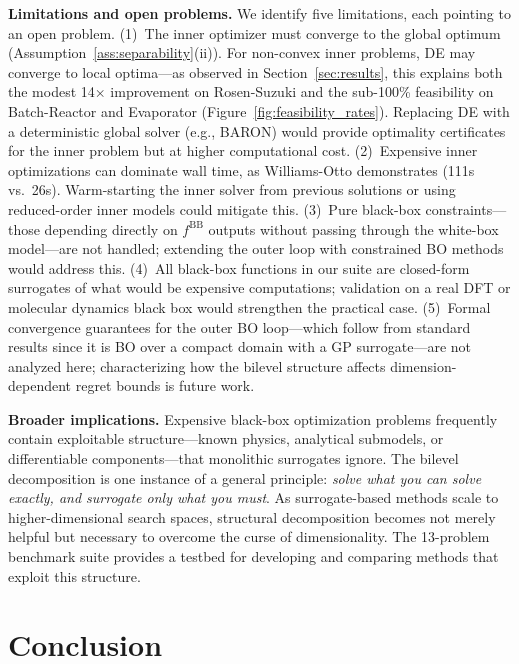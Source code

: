 \documentclass[12pt,a4paper]{article}%
\theoremstyle{plain}%
\theoremstyle{remark}%
\theoremstyle{definition}%
\def\BB{\mathrm{BB}}
\begin{document}
\noindent\textbf{Limitations and open problems.}
We identify five limitations, each pointing to an open problem. (1)~The inner optimizer must converge to the global optimum (Assumption~\ref{ass:separability}(ii)). For non-convex inner problems, DE may converge to local optima---as observed in Section~\ref{sec:results}, this explains both the modest 14$\times$ improvement on Rosen-Suzuki and the sub-100\% feasibility on Batch-Reactor and Evaporator (Figure~\ref{fig:feasibility_rates}). Replacing DE with a deterministic global solver (e.g., BARON) would provide optimality certificates for the inner problem but at higher computational cost. (2)~Expensive inner optimizations can dominate wall time, as Williams-Otto demonstrates (111s vs.\ 26s). Warm-starting the inner solver from previous solutions or using reduced-order inner models could mitigate this. (3)~Pure black-box constraints---those depending directly on $f^{\BB}$ outputs without passing through the white-box model---are not handled; extending the outer loop with constrained BO methods~\cite{gardner2014,gelbart2014unknown} would address this. (4)~All black-box functions in our suite are closed-form surrogates of what would be expensive computations; validation on a real DFT or molecular dynamics black box would strengthen the practical case. (5)~Formal convergence guarantees for the outer BO loop---which follow from standard results since it is BO over a compact domain with a GP surrogate---are not analyzed here; characterizing how the bilevel structure affects dimension-dependent regret bounds is future work.

\noindent\textbf{Broader implications.}
Expensive black-box optimization problems frequently contain exploitable structure---known physics, analytical submodels, or differentiable components---that monolithic surrogates ignore. The bilevel decomposition is one instance of a general principle: \emph{solve what you can solve exactly, and surrogate only what you must}. As surrogate-based methods scale to higher-dimensional search spaces, structural decomposition becomes not merely helpful but necessary to overcome the curse of dimensionality. The 13-problem benchmark suite provides a testbed for developing and comparing methods that exploit this structure.

\section{Conclusion}\label{sec:conclusion}
\end{document}
